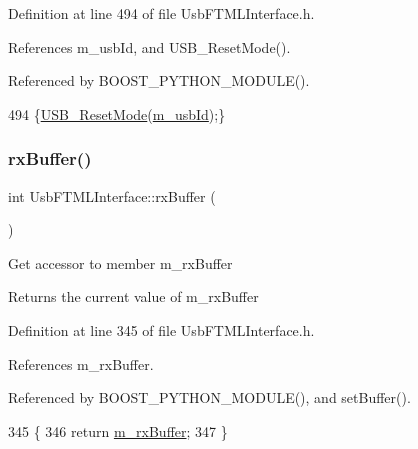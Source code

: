 Definition at line 494 of file Usb\+F\+T\+M\+L\+Interface.\+h.



References m\+\_\+usb\+Id, and U\+S\+B\+\_\+\+Reset\+Mode().



Referenced by B\+O\+O\+S\+T\+\_\+\+P\+Y\+T\+H\+O\+N\+\_\+\+M\+O\+D\+U\+L\+E().


\begin{DoxyCode}
494 \{\hyperlink{LALUsbML_8h_a784f57af1433a5334f4a7d23ee4caad9}{USB\_ResetMode}(\hyperlink{classUsbFTMLInterface_aab6754587c303660d5c498ce34a2b4c8}{m\_usbId});\}
\end{DoxyCode}
\mbox{\label{classUsbFTMLInterface_a41db8f21098bca8fb7a85ce1058ab10b}} 
\subsubsection{\texorpdfstring{rx\+Buffer()}{rxBuffer()}}
{\footnotesize\ttfamily int Usb\+F\+T\+M\+L\+Interface\+::rx\+Buffer (\begin{DoxyParamCaption}{ }\end{DoxyParamCaption})\hspace{0.3cm}{\ttfamily [inline]}}

Get accessor to member m\+\_\+rx\+Buffer \begin{DoxyReturn}{Returns}
the current value of m\+\_\+rx\+Buffer 
\end{DoxyReturn}


Definition at line 345 of file Usb\+F\+T\+M\+L\+Interface.\+h.



References m\+\_\+rx\+Buffer.



Referenced by B\+O\+O\+S\+T\+\_\+\+P\+Y\+T\+H\+O\+N\+\_\+\+M\+O\+D\+U\+L\+E(), and set\+Buffer().


\begin{DoxyCode}
345                   \{
346     \textcolor{keywordflow}{return} \hyperlink{classUsbFTMLInterface_a8f0f8bb2a4fe14ca4890695f41fbcbf8}{m\_rxBuffer};
347   \}
\end{DoxyCode}
\mbox{\label{classUsbFTMLInterface_a106df14066462a38f7e4849c9d15828a}} 
